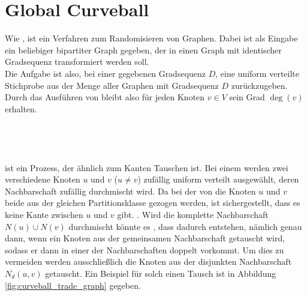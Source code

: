 \section{Global Curveball }
Wie , ist \gc ein Verfahren zum Randomisieren von Graphen.
Dabei ist als Eingabe ein beliebiger bipartiter Graph gegeben, der in einen 
Graph mit identischer Gradsequenz transformiert werden soll.
\\
Die Aufgabe ist also, bei einer gegebenen Gradsequenz $D$, eine uniform verteilte Stichprobe
aus der Menge aller Graphen mit Gradsequenz $D$ zurückzugeben. Durch das Ausführen von \gc 
bleibt also für jeden Knoten $v\in V$ sein Grad $\deg(v)$ erhalten. 
\\
\\
\\
\\
\\
\fett{\cb} ist  ein Prozess, der ähnlich zum Kanten Tauschen ist. Bei einem \ct werden
zwei verschiedene Knoten $u$ und $v$ ($u\neq v$) zufällig uniform verteilt ausgewählt, deren Nachbarschaft
zufällig durchmischt wird. Da bei der   von \cb{}
die Knoten $u$ und $v$ beide aus der gleichen Partitionsklasse gezogen werden, ist sichergestellt, dass
es keine Kante zwischen $u$ und $v$ gibt. .
Wird die komplette Nachbarschaft $N(u) \cup N(v)$ durchmischt könnte es , 
dass dadurch  entstehen,  
nämlich genau dann, wenn ein Knoten aus der gemeinsamen Nachbarschaft getauscht wird, sodass er dann in 
einer der Nachbarschaften doppelt vorkommt.
Um dies zu vermeiden werden ausschließlich die Knoten aus der disjunkten Nachbarschaft $N_{d}(u,v)$ getauscht.
Ein Beispiel für solch einen Tausch ist in Abbildung \ref{fig:curveball_trade_graph} gegeben.
%
%
%

